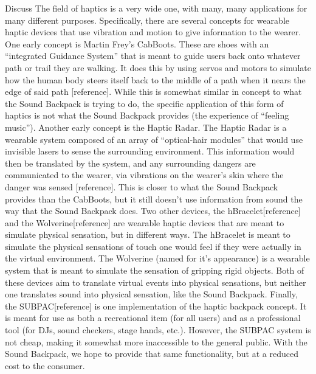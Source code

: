 Discuss The field of haptics is a very wide one, with many, many applications for many different purposes. Specifically, there are several concepts for wearable haptic devices that use vibration and motion to give information to the wearer. One early concept is Martin Frey’s CabBoots. These are shoes with an “integrated Guidance System” that is meant to guide users back onto whatever path or trail they are walking. It does this by using servos and motors to simulate how the human body steers itself back to the middle of a path when it nears the edge of said path [reference]. While this is somewhat similar in concept to what the Sound Backpack is trying to do, the specific application of this form of haptics is not what the Sound Backpack provides (the experience of “feeling music”). Another early concept is the Haptic Radar. The Haptic Radar is a wearable system composed of an array of “optical-hair modules” that would use invisible lasers to sense the surrounding environment. This information would then be translated by the system, and any surrounding dangers are communicated to the wearer, via vibrations on the wearer’s skin  where the danger was sensed [reference]. This is closer to what the Sound Backpack provides than the CabBoots, but it still doesn’t use information from sound the way that the Sound Backpack does. Two other devices, the hBracelet[reference] and the Wolverine[reference] are wearable haptic devices that are meant to simulate physical sensation, but in different ways. The hBracelet is meant to simulate the physical sensations of touch one would feel if they were actually in the virtual environment. The Wolverine (named for it’s appearance) is a wearable system that is meant to simulate the sensation of gripping rigid objects. Both of these devices aim to translate virtual events into physical sensations, but neither one translates sound into physical sensation, like the Sound Backpack. Finally, the SUBPAC[reference] is one implementation of the haptic backpack concept. It is meant for use as both a recreational item (for all users) and as a professional tool (for DJs, sound checkers, stage hands, etc.). However, the SUBPAC system is not cheap, making it somewhat more inaccessible to the general public. With the Sound Backpack, we hope to provide that same functionality, but at a reduced cost to the consumer.